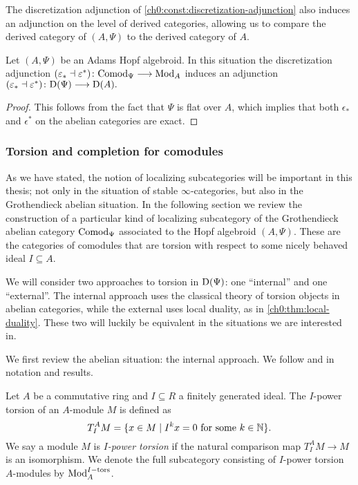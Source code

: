 The discretization adjunction of \cref{ch0:const:discretization-adjunction} also induces an adjunction on the level of derived categories, allowing us to compare the derived category of $(A, \Psi)$ to the derived category of $A$. 

\begin{proposition}
    Let $(A,\Psi)$ be an Adams Hopf algebroid. In this situation the discretization adjunction $(\varepsilon_*\dashv \varepsilon^*)\colon \mathrm{Comod}_\Psi\longrightarrow \mathrm{Mod}_A$ induces an adjunction $(\varepsilon_*\dashv \varepsilon^*)\colon \mathrm{D}(\Psi)\longrightarrow \mathrm{D}(A).$
\end{proposition}
\begin{proof}
    This follows from the fact that $\Psi$ is flat over $A$, which implies that both $\epsilon_*$ and $\epsilon^*$ on the abelian categories are exact. 
\end{proof}




\subsubsection{Torsion and completion for comodules}
\label{ch0:sssec:torsion-and-completion-for-comodules}

As we have stated, the notion of localizing subcategories will be important in this thesis; not only in the situation of stable $\infty$-categories, but also in the Grothendieck abelian situation. In the following section we review the construction of a particular kind of localizing subcategory of the Grothendieck abelian category $\mathrm{Comod}_\Psi$ associated to the Hopf algebroid $(A,\Psi)$. These are the categories of comodules that are torsion with respect to some nicely behaved ideal $I\subseteq A$. 

We will consider two approaches to torsion in $\mathrm{D}(\Psi)$: one ``internal'' and one ``external''. The internal approach uses the classical theory of torsion objects in abelian categories, while the external uses local duality, as in \cref{ch0:thm:local-duality}. These two will luckily be equivalent in the situations we are interested in. 

We first review the abelian situation: the internal approach. We follow \cite{barthel-heard-valenzuela_2018} and \cite{barthel-heard-valenzuela_2020} in notation and results. 

\begin{definition}
    \label{def:I-power-torsion-module}
    Let $A$ be a commutative ring and $I\subseteq R$ a finitely generated ideal. The $I$-power torsion of an $A$-module $M$ is defined as
    \[T_I^A M = \{x\in M \mid I^k x = 0 \text{ for some } k\in \mathbb{N}\}.\]
    We say a module $M$ is \emph{$I$-power torsion} if the natural comparison map $T_I^A M\longrightarrow M$ is an isomorphism. We denote the full subcategory consisting of $I$-power torsion $A$-modules by $\mathrm{Mod}_A^{I-\mathrm{tors}}$. 
\end{definition}

